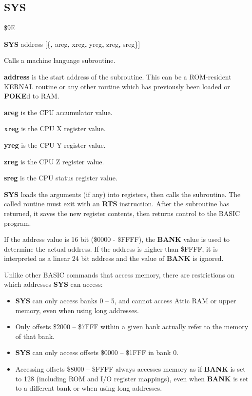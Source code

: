 
\newpage
\subsection{SYS}
\begin{description}[leftmargin=2cm,style=nextline]
\item [Token:]    \$9E

\item [Format:]   {\bf SYS} address [\{{\bf,} areg{\bf,} xreg{\bf,} yreg{\bf,}	zreg{\bf,} sreg\}]

\item [Usage:]    Calls a machine language subroutine.

                  {\bf address} is the start address of the subroutine. This can be a ROM-resident KERNAL routine or any other routine which has previously been loaded or {\bf POKE}d to RAM.

                  {\bf areg} is the CPU accumulator value.

                  {\bf xreg} is the CPU X register value.

                  {\bf yreg} is the CPU Y register value.

                  {\bf zreg} is the CPU Z register value.

                  {\bf sreg} is the CPU status register value.

                  {\bf SYS} loads the arguments (if any) into registers, then calls the subroutine. The called routine must exit with an {\bf RTS} instruction. After the subroutine has returned, it saves the new register contents, then returns control to the BASIC program.

                  If the address value is 16 bit (\$0000 - \$FFFF), the {\bf BANK} value is used to determine the actual address. If the address is higher than \$FFFF, it is interpreted as a linear 24 bit address and the value of {\bf BANK} is ignored.

                  Unlike other BASIC commands that access memory, there are restrictions on which addresses {\bf SYS} can access:

                  \begin{itemize}
                     \item {\bf SYS} can only access banks 0 -- 5, and cannot access Attic RAM or upper memory, even when using long addresses.
                     \item Only offsets \$2000 -- \$7FFF within a given bank actually refer to the memory of that bank.
                     \item {\bf SYS} can only access offsets \$0000 -- \$1FFF in bank 0.
                     \item Accessing offsets \$8000 -- \$FFFF always accesses memory as if {\bf BANK} is set to 128 (including ROM and I/O register mappings), even when {\bf BANK} is set to a different bank or when using long addresses.
                  \end{itemize}


\end{description}
